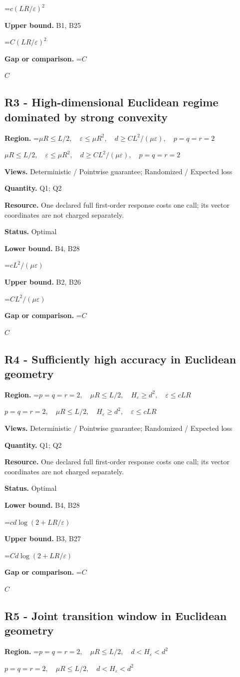 \documentclass[10pt,a4paper]{article}
\newcommand{\AtlasMath}[1]{\par\begingroup\centering\setbox0=\hbox{$\displaystyle #1$}\ifdim\wd0>1.4\linewidth\typeout{ATLAS WIDE FORMULA: \the\wd0}\fi\ifdim\wd0>\linewidth\resizebox{\linewidth}{!}{\box0}\else\box0\fi\par\endgroup}
\newcommand{\AtlasInlineMath}[1]{\begingroup\setbox0=\hbox{$#1$}\ifdim\wd0>.4\linewidth\endgroup\AtlasMath{#1}\else\endgroup$#1$\fi}
\begin{document}
\AtlasMath{c(LR/\varepsilon)^2}
\textbf{Upper bound.} B1, B25

\AtlasMath{C(LR/\varepsilon)^2}
\textbf{Gap or comparison.} \AtlasInlineMath{C}

\subsection{R3 - High-dimensional Euclidean regime dominated by strong convexity}
\textbf{Region.} \AtlasInlineMath{\mu R\le L/2,\quad\varepsilon\le\mu R^2,\quad d\ge CL^2/(\mu\varepsilon),\quad p=q=r=2}

\textbf{Views.} Deterministic / Pointwise guarantee; Randomized / Expected loss

\textbf{Quantity.} Q1; Q2

\textbf{Resource.} One declared full first-order response costs one call; its vector coordinates are not charged separately.

\textbf{Status.} Optimal

\textbf{Lower bound.} B4, B28

\AtlasMath{c L^2/(\mu\varepsilon)}
\textbf{Upper bound.} B2, B26

\AtlasMath{C L^2/(\mu\varepsilon)}
\textbf{Gap or comparison.} \AtlasInlineMath{C}

\subsection{R4 - Sufficiently high accuracy in Euclidean geometry}
\textbf{Region.} \AtlasInlineMath{p=q=r=2,\quad\mu R\le L/2,\quad H_\varepsilon\ge d^2,\quad\varepsilon\le cLR}

\textbf{Views.} Deterministic / Pointwise guarantee; Randomized / Expected loss

\textbf{Quantity.} Q1; Q2

\textbf{Resource.} One declared full first-order response costs one call; its vector coordinates are not charged separately.

\textbf{Status.} Optimal

\textbf{Lower bound.} B4, B28

\AtlasMath{c d\log(2+LR/\varepsilon)}
\textbf{Upper bound.} B3, B27

\AtlasMath{C d\log(2+LR/\varepsilon)}
\textbf{Gap or comparison.} \AtlasInlineMath{C}

\subsection{R5 - Joint transition window in Euclidean geometry}
\textbf{Region.} \AtlasInlineMath{p=q=r=2,\quad\mu R\le L/2,\quad d<H_\varepsilon<d^2}
\end{document}
